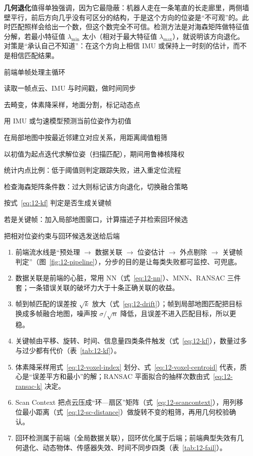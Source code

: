 \textbf{几何退化}值得单独强调，因为它最隐蔽：机器人走在一条笔直的长走廊里，两侧墙壁平行，前后方向几乎没有可区分的结构，于是这个方向的位姿是``不可观''的。此时匹配照样会给出一个数，但这个数完全不可信。检测方法是对海森矩阵做特征值分解，若最小特征值 $\lambda_{\min}$ 太小（相对于最大特征值 $\lambda_{\max}$），就说明该方向退化。对策是``承认自己不知道''：在这个方向上相信 IMU 或保持上一时刻的估计，而不是相信匹配结果。

\begin{pseudo}{前端单帧处理主循环}
  \item 读取一帧点云、IMU 与时间戳，做时间同步
  \item 去畸变，体素降采样，地面分割，标记动态点
  \item 用 IMU 或匀速模型预测当前位姿作为初值
  \item 在局部地图中按最近邻建立对应关系，用距离阈值粗筛
  \item 以初值为起点迭代求解位姿（扫描匹配），期间用鲁棒核降权
  \item 统计内点比例：低于阈值则判定跟踪失败，进入重定位流程
  \item 检查海森矩阵条件数：过大则标记该方向退化，切换融合策略
  \item 按式~\eqref{eq:12-kf} 判定是否生成关键帧
  \item 若是关键帧：加入局部地图窗口，计算描述子并检索回环候选
  \item 把相对位姿约束与回环候选发送给后端
\end{pseudo}

\begin{summary}
\begin{enumerate}
  \item 前端流水线是``预处理 $\rightarrow$ 数据关联 $\rightarrow$ 位姿估计 $\rightarrow$ 外点剔除 $\rightarrow$ 关键帧判定''（图~\ref{fig:12-pipeline}），分步的目的是让每类失败都可监控、可兜底。
  \item 数据关联是前端的心脏，常用 NN（式~\eqref{eq:12-nn}）、MNN、RANSAC 三件套；一条错误关联的破坏力大于十条正确关联的收益。
  \item 帧到帧匹配的误差按 $\sqrt{k}$ 放大（式~\eqref{eq:12-drift}）；帧到局部地图匹配把目标换成多帧融合地图，噪声按 $\sigma/\sqrt{n}$ 降低，且误差不进入匹配目标，所以更稳。
  \item 关键帧由平移、旋转、时间、信息量四类条件触发（式~\eqref{eq:12-kf}），数量过多与过少都有代价（表~\ref{tab:12-kf}）。
  \item 体素降采样用式~\eqref{eq:12-voxel-index} 划分、式~\eqref{eq:12-voxel-centroid} 代表，质心是``误差平方和最小''的解；RANSAC 平面拟合的抽样次数由式~\eqref{eq:12-ransac-k} 决定。
  \item Scan Context 把点云压成``环—扇区''矩阵（式~\eqref{eq:12-scancontext}），用列移位最小距离（式~\eqref{eq:12-sc-distance}）做旋转不变的粗筛，再用几何校验确认。
  \item 回环检测属于前端（全局数据关联），回环优化属于后端；前端典型失效有几何退化、动态物体、传感器失效、时间不同步四类（表~\ref{tab:12-fail}）。
\end{enumerate}


\end{summary}

